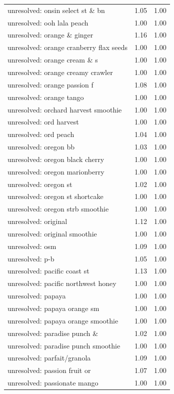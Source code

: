 \begin{table}
\begin{tabular}{lrr}
unresolved: onsin select st \& bn & 1.05 & 1.00 \\
unresolved: ooh lala peach & 1.00 & 1.00 \\
unresolved: orange \& ginger & 1.16 & 1.00 \\
unresolved: orange cranberry flax seeds & 1.00 & 1.00 \\
unresolved: orange cream \& s & 1.00 & 1.00 \\
unresolved: orange creamy crawler & 1.00 & 1.00 \\
unresolved: orange passion f & 1.08 & 1.00 \\
unresolved: orange tango & 1.00 & 1.00 \\
unresolved: orchard harvest smoothie & 1.00 & 1.00 \\
unresolved: ord harvest & 1.00 & 1.00 \\
unresolved: ord peach & 1.04 & 1.00 \\
unresolved: oregon bb & 1.03 & 1.00 \\
unresolved: oregon black cherry & 1.00 & 1.00 \\
unresolved: oregon marionberry & 1.00 & 1.00 \\
unresolved: oregon st & 1.02 & 1.00 \\
unresolved: oregon st shortcake & 1.00 & 1.00 \\
unresolved: oregon strb smoothie & 1.00 & 1.00 \\
unresolved: original & 1.12 & 1.00 \\
unresolved: original smoothie & 1.00 & 1.00 \\
unresolved: osm & 1.09 & 1.00 \\
unresolved: p-b & 1.05 & 1.00 \\
unresolved: pacific coast st & 1.13 & 1.00 \\
unresolved: pacific northwest honey & 1.00 & 1.00 \\
unresolved: papaya & 1.00 & 1.00 \\
unresolved: papaya orange sm & 1.00 & 1.00 \\
unresolved: papaya orange smoothie & 1.00 & 1.00 \\
unresolved: paradise punch \& & 1.02 & 1.00 \\
unresolved: paradise punch smoothie & 1.00 & 1.00 \\
unresolved: parfait/granola & 1.09 & 1.00 \\
unresolved: passion fruit or & 1.07 & 1.00 \\
unresolved: passionate mango & 1.00 & 1.00 \\

\end{tabular}
\end{table}
